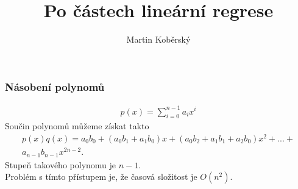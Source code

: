 \documentclass{beamer}
\title{Po částech lineární regrese}
\author[Martin Koběrský]{Martin Koběrský}
\begin{document}
	
	\frame{\titlepage}
	\begin{frame}
	\frametitle{Násobení polynomů}
	\begin{align*}
	p(x) = \sum_{i=0}^{n-1}a_ix^{i}
	\end{align*}
	Součin polynomů můžeme získat takto
	\begin{align*}
	p(x)q(x) = a_0b_0 + (a_0b_1 + a_1b_0)x + (a_0b_2 + a_1b_1 + a_2b_0)x^2 + ... +\\ a_{n-1}b_{n-1}x^{2n-2}.
	\end{align*}
	Stupeň takového polynomu je $n-1$. \\
	Problém s tímto přístupem je, že časová složitost je $O(n^2)$.
\end{frame}
\end{document}
